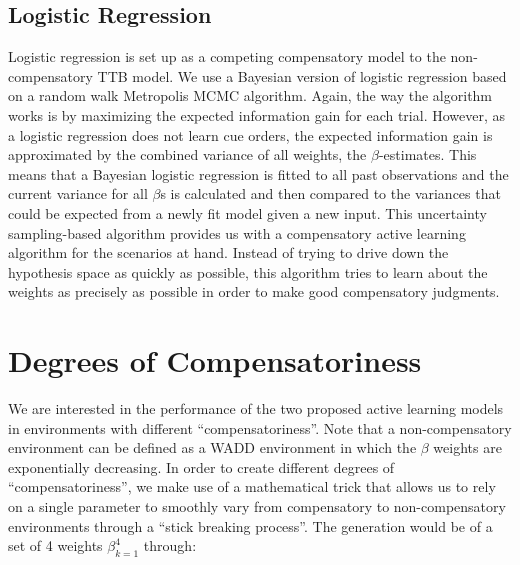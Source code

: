 \documentclass[10pt,letterpaper]{article}
\begin{document}
\subsection{Logistic Regression}
Logistic regression is set up as a competing compensatory model to the non-compensatory TTB model. We use a Bayesian version of logistic regression based on a random walk Metropolis MCMC algorithm. Again, the way the algorithm works is by maximizing the expected information gain for each trial. However, as a logistic regression does not learn cue orders, the expected information gain is approximated by the combined variance of all weights, the $\beta$-estimates. This means that a Bayesian logistic regression is fitted to all past observations and the current variance for all $\beta$s is calculated and then compared to the variances that could be expected from a newly fit model given a new input. This uncertainty sampling-based algorithm provides us with a compensatory active learning algorithm for the scenarios at hand. Instead of trying to drive down the hypothesis space as quickly as possible, this algorithm tries to learn about the weights as precisely as possible in order to make good compensatory judgments. 
\section{Degrees of Compensatoriness}
We are interested in the performance of the two proposed active learning models in environments with different ``compensatoriness''. Note that a non-compensatory environment can be defined as a WADD environment in which the $\beta$ weights are exponentially decreasing. In order to create different degrees of ``compensatoriness'', we make use of a mathematical trick that allows us to rely on a single parameter to smoothly vary from compensatory to non-compensatory environments through a ``stick breaking process''. The generation would be of a set of 4 weights ${\beta}_{k=1}^4$ through:
\end{document}
